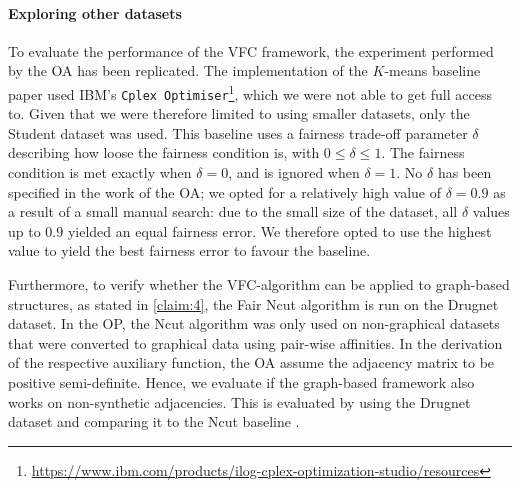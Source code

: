 \paragraph{Exploring other datasets} To evaluate the performance of the VFC framework, the experiment performed by the OA has been replicated. The implementation of the $K$-means baseline paper \citep{bera2019fair} used IBM's \texttt{Cplex Optimiser}\footnote{\url{https://www.ibm.com/products/ilog-cplex-optimization-studio/resources}}, which we were not able to get full access to. Given that we were therefore limited to using smaller datasets, only the Student dataset was used. This baseline uses a fairness trade-off parameter $\delta$ describing how loose the fairness condition is, with $0 \leq \delta \leq 1$. The fairness condition is met exactly when $\delta = 0$, and is ignored when $\delta = 1$. No $\delta$ has been specified in the work of the OA; we opted for a relatively high value of $\delta = 0.9$ as a result of a small manual search: due to the small size of the dataset, all $\delta$ values up to $0.9$ yielded an equal fairness error. We therefore opted to use the highest value to yield the best fairness error to favour the baseline. 

Furthermore, to verify whether the VFC-algorithm can be applied to graph-based structures, as stated in \ref{claim:4}, the Fair Ncut algorithm is run on the Drugnet dataset. In the OP, the Ncut algorithm was only used on non-graphical datasets that were converted to graphical data using pair-wise affinities. In the derivation of the respective auxiliary function, the OA assume the adjacency matrix to be positive semi-definite. Hence, we evaluate if the graph-based framework also works on non-synthetic adjacencies. This is evaluated by using the Drugnet dataset and comparing it to the Ncut baseline \citep{kleindessner2019guarantees}.

